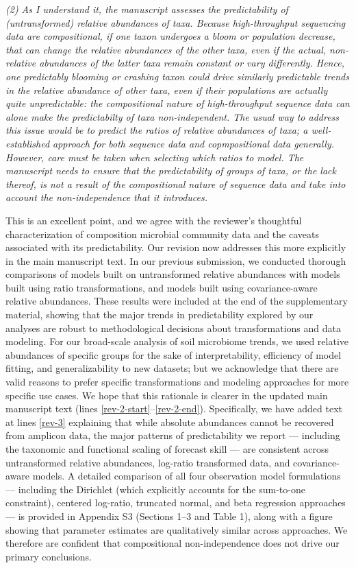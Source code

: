 \documentclass[11pt]{article}
\begin{document}
\textit{(2) As I understand it, the manuscript assesses the predictability of (untransformed) relative abundances of taxa. Because high-throughput sequencing data are compositional, if one taxon undergoes a bloom or population decrease, that can change the relative abundances of the other taxa, even if the actual, non-relative abundances of the latter taxa remain constant or vary differently. Hence, one predictably blooming or crashing taxon could drive similarly predictable trends in the relative abundance of other taxa, even if their populations are actually quite unpredictable: the compositional nature of high-throughput sequence data can alone make the predictabilty of taxa non-independent. The usual way to address this issue would be to predict the ratios of relative abundances of taxa; a well-established approach for both sequence data and copmpositional data generally. However, care must be taken when selecting which ratios to model. The manuscript needs to ensure that the predictability of groups of taxa, or the lack thereof, is not a result of the compositional nature of sequence data and take into account the non-independence that it introduces.}

This is an excellent point, and we agree with the reviewer's thoughtful characterization of composition microbial community data and the caveats associated with its predictability. Our revision now addresses this more explicitly in the main manuscript text. In our previous submission, we conducted thorough comparisons of models built on untransformed relative abundances with models built using ratio transformations, and models built using covariance-aware relative abundances. These results were included at the end of the supplementary material, showing that the major trends in predictability explored by our analyses are robust to methodological decisions about transformations and data modeling. For our broad-scale analysis of soil microbiome trends, we used relative abundances of specific groups for the sake of interpretability, efficiency of model fitting, and generalizability to new datasets; but we acknowledge that there are valid reasons to prefer specific transformations and modeling approaches for more specific use cases. We hope that this rationale is clearer in the updated main manuscript text (lines \ref{rev-2-start}--\ref{rev-2-end}). Specifically, we have added text at lines \ref{rev-3} explaining that while absolute abundances cannot be recovered from amplicon data, the major patterns of predictability we report --- including the taxonomic and functional scaling of forecast skill --- are consistent across untransformed relative abundances, log-ratio transformed data, and covariance-aware models. A detailed comparison of all four observation model formulations --- including the Dirichlet (which explicitly accounts for the sum-to-one constraint), centered log-ratio, truncated normal, and beta regression approaches --- is provided in Appendix S3 (Sections 1--3 and Table 1), along with a figure showing that parameter estimates are qualitatively similar across approaches. We therefore are confident that compositional non-independence does not drive our primary conclusions.
\end{document}
